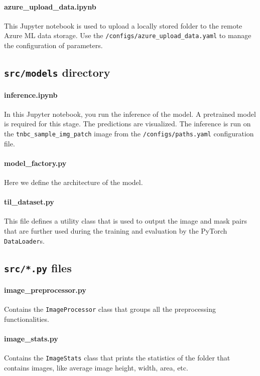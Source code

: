 \paragraph{azure\_upload\_data.ipynb}
This Jupyter notebook is used to upload a locally stored folder to the
remote Azure ML data storage. Use the
\texttt{/configs/azure\_upload\_data.yaml} to manage the configuration
of parameters.

\subsection{\texttt{src/models} directory}\label{srcmodels-directory}

\paragraph{inference.ipynb}
In this Jupyter notebook, you run the inference of the model. A
pretrained model is required for this stage. The predictions are
visualized. The inference is run on the
\texttt{tnbc\_sample\_img\_patch} image from the
\texttt{/configs/paths.yaml} configuration file.

\paragraph{model\_factory.py}
Here we define the architecture of the model.

\paragraph{til\_dataset.py}
This file defines a utility class that is used to output the image and
mask pairs that are further used during the training and evaluation by
the PyTorch \texttt{DataLoader}s.

\subsection{\texttt{src/*.py} files}\label{src.py-files}

\paragraph{image\_preprocessor.py}
Contains the \texttt{ImageProcessor} class that groups all the
preprocessing functionalities.

\paragraph{image\_stats.py}
Contains the \texttt{ImageStats} class that prints the statistics of the
folder that contains images, like average image height, width, area,
etc.

